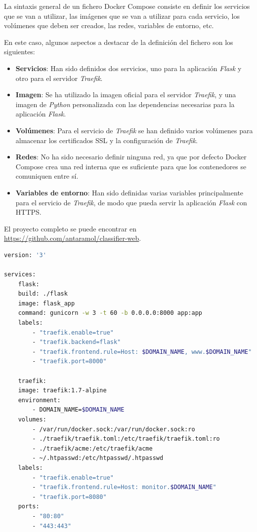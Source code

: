 La sintaxis general de un fichero Docker Compose consiste en definir los servicios que se van a utilizar, las imágenes que se van a utilizar para cada servicio, los volúmenes que deben ser creados, las redes, variables de entorno, etc.

En este caso, algunos aspectos a destacar de la definición del fichero son los siguientes:

\begin{itemize}
    \item \textbf{Servicios}: Han sido definidos dos servicios, uno para la aplicación \textit{Flask} y otro para el servidor \textit{Traefik}.
    \item \textbf{Imagen}: Se ha utilizado la imagen oficial para el servidor \textit{Traefik}, y una imagen de \textit{Python} personalizada con las dependencias necesarias para la aplicación \textit{Flask}.
    \item \textbf{Volúmenes}: Para el servicio de \textit{Traefik} se han definido varios volúmenes para almacenar los certificados SSL y la configuración de \textit{Traefik}.
    \item \textbf{Redes}: No ha sido necesario definir ninguna red, ya que por defecto Docker Compose crea una red interna que es suficiente para que los contenedores se comuniquen entre sí.
    \item \textbf{Variables de entorno}: Han sido definidas varias variables principalmente para el servicio de \textit{Traefik}, de modo que pueda servir la aplicación \textit{Flask} con HTTPS.
\end{itemize}

El proyecto completo se puede encontrar en \url{https://github.com/antaramol/classifier-web}.

\begin{lstlisting}[language=bash, caption={Fichero Docker Compose.}, label={lst:docker-compose}]
version: '3'

services:
    flask:
    build: ./flask
    image: flask_app
    command: gunicorn -w 3 -t 60 -b 0.0.0.0:8000 app:app
    labels:
        - "traefik.enable=true"
        - "traefik.backend=flask"
        - "traefik.frontend.rule=Host: $DOMAIN_NAME, www.$DOMAIN_NAME"
        - "traefik.port=8000"

    traefik:
    image: traefik:1.7-alpine
    environment:
        - DOMAIN_NAME=$DOMAIN_NAME
    volumes:
        - /var/run/docker.sock:/var/run/docker.sock:ro
        - ./traefik/traefik.toml:/etc/traefik/traefik.toml:ro
        - ./traefik/acme:/etc/traefik/acme
        - ~/.htpasswd:/etc/htpasswd/.htpasswd
    labels:
        - "traefik.enable=true"
        - "traefik.frontend.rule=Host: monitor.$DOMAIN_NAME"
        - "traefik.port=8080"
    ports:
        - "80:80"
        - "443:443"
    

\end{lstlisting}


